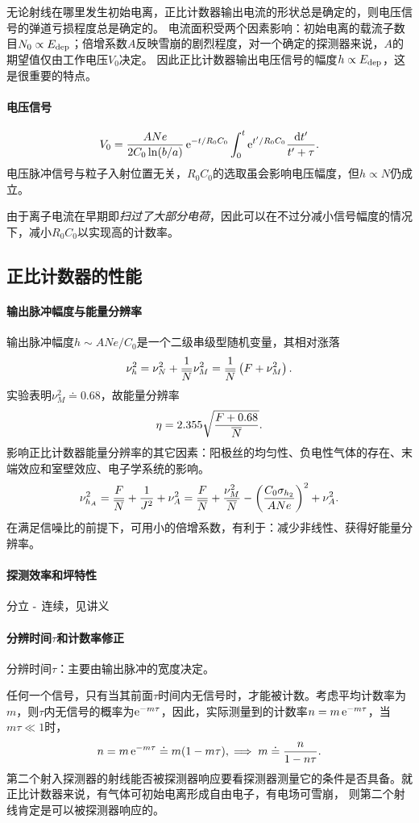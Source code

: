 无论射线在哪里发生初始电离，正比计数器输出电流的形状总是确定的，则电压信号的弹道亏损程度总是确定的。
电流面积受两个因素影响：初始电离的载流子数目$N_0\propto E_{\mathrm{dep}}$；倍增系数$A$反映雪崩的剧烈程度，对一个确定的探测器来说，$A$的期望值仅由工作电压$V_0$决定。
因此正比计数器输出电压信号的幅度$h\propto E_{\mathrm{dep}}$，这是很重要的特点。
\paragraph{电压信号}
\[
	V_0=\frac{ANe}{2C_0\ln(b/a)}\mathop{}\!\mathrm{e}^{-t/R_0C_0}\int_0^t\mathop{}\!\mathrm{e}^{t'/R_0C_0}\frac{\mathop{}\!\mathrm{d} t'}{t'+\tau}.
\]
电压脉冲信号与粒子入射位置无关，$R_0C_0$的选取虽会影响电压幅度，但$h\propto N$仍成立。

由于离子电流在早期即\textit{扫过了大部分电荷}，因此可以在不过分减小信号幅度的情况下，减小$R_0C_0$以实现高的计数率。

\subsection{正比计数器的性能}

\paragraph{输出脉冲幅度与能量分辨率}
输出脉冲幅度$h\sim ANe/C_0$是一个二级串级型随机变量，其相对涨落
\[
	\nu_h^2=\nu_N^2+\frac1{\overline{N}}\nu_M^2=\frac1{\overline{N}}\left(F+\nu_M^2\right).
\]
实验表明$\nu_M^2\doteq 0.68$，故能量分辨率
\begin{align}
	\eta=2.355\sqrt{\frac{F+0.68}{\overline{N}}}.
\end{align}
影响正比计数器能量分辨率的其它因素：阳极丝的均匀性、负电性气体的存在、末端效应和室壁效应、电子学系统的影响。
\[
	\nu_{h_A}^2=\frac F{\overline{N}}+\frac1{J^2}+\nu_A^2=\frac F{\overline{N}}+\frac{\nu_M^2}{\overline{N}}-\left(\frac{C_0\sigma_{h_2}}{ANe}\right)^2+\nu_A^2.
\]
在满足信噪比的前提下，可用小的倍增系数，有利于：减少非线性、获得好能量分辨率。
\paragraph{探测效率和坪特性}
分立$~\text{-}~$连续，见讲义
\paragraph{分辨时间$\tau$和计数率修正}
分辨时间$\tau$：主要由输出脉冲的宽度决定。%

任何一个信号，只有当其前面$\tau$时间内无信号时，才能被计数。考虑平均计数率为$m$，则$\tau$内无信号的概率为$\mathop{}\!\mathrm{e}^{-m\tau}$，因此，实际测量到的计数率$n=m\mathop{}\!\mathrm{e}^{-m\tau}$，当$m\tau\ll 1$时，
\begin{align}
	n=m\mathop{}\!\mathrm{e}^{-m\tau}\doteq m(1-m\tau),\implies m\doteq\frac n{1-n\tau}.
\end{align}
第二个射入探测器的射线能否被探测器响应要看探测器测量它的条件是否具备。就正比计数器来说，有气体可初始电离形成自由电子，有电场可雪崩，%
则第二个射线肯定是可以被探测器响应的。%


